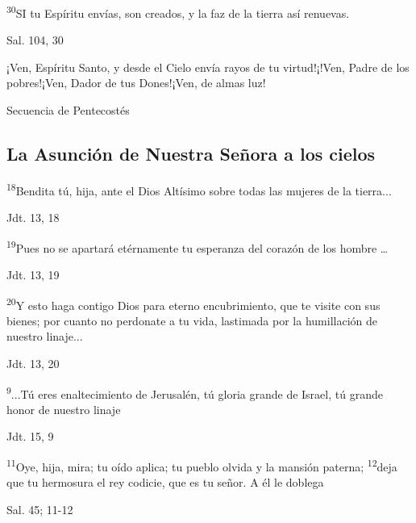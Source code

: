 \documentclass[a4paper,11pt]{article}
\begin{document}
      \textsuperscript{30}SI tu Espíritu envías, son creados, y la faz de la tierra así renuevas.
      \begin{flushright}
        Sal. 104, 30
      \end{flushright}

      ¡Ven, Espíritu Santo, y desde el Cielo envía rayos de tu virtud!¡!Ven, Padre de los pobres!¡Ven, Dador de tus Dones!¡Ven, de almas luz!
      \begin{flushright}
        Secuencia de Pentecostés
      \end{flushright}

    \subsection*{\hfil La Asunción de Nuestra Señora a los cielos \hfil}

      \textsuperscript{18}Bendita tú, hija, ante el Dios Altísimo sobre todas las mujeres de la tierra...
      \begin{flushright}
        Jdt. 13, 18
      \end{flushright}

      \textsuperscript{19}Pues no se apartará etérnamente tu esperanza del corazón de los hombre \ldots
      \begin{flushright}
        Jdt. 13, 19
      \end{flushright}

      \textsuperscript{20}Y esto haga contigo Dios para eterno encubrimiento, que te visite con sus bienes; por cuanto no perdonate
      a tu vida, lastimada por la humillación de nuestro linaje...
      \begin{flushright}
        Jdt. 13, 20
      \end{flushright}

      \textsuperscript{9}...Tú eres enaltecimiento de Jerusalén, tú gloria grande de Israel, tú grande honor de nuestro linaje
      \begin{flushright}
        Jdt. 15, 9
      \end{flushright}

      \textsuperscript{11}Oye, hija, mira; tu oído aplica; tu pueblo olvida y la mansión paterna; \textsuperscript{12}deja que tu hermosura
      el rey codicie, que es tu señor. A él le doblega
      \begin{flushright}
        Sal. 45; 11-12
      \end{flushright}
\end{document}
